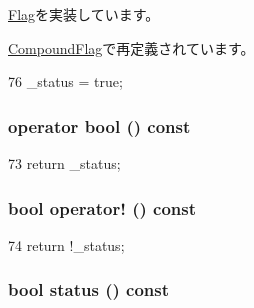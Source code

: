 \hyperlink{classDebug_1_1Flag_ad1c349e10e4417179f5eb3cb519670b5}{Flag}を実装しています。

\hyperlink{classDebug_1_1CompoundFlag_a486f22824bd83c5308a0d70ffac6f758}{CompoundFlag}で再定義されています。


\begin{DoxyCode}
76 { _status = true; }
\end{DoxyCode}
\hypertarget{classDebug_1_1SimpleFlag_aa385aa18f5e42db5a415c25a90f4193d}{
\subsubsection[{operator bool}]{\setlength{\rightskip}{0pt plus 5cm}operator bool () const}}
\label{classDebug_1_1SimpleFlag_aa385aa18f5e42db5a415c25a90f4193d}



\begin{DoxyCode}
73 { return _status; }
\end{DoxyCode}
\hypertarget{classDebug_1_1SimpleFlag_ac8b1d32dbd52d431450c70b151cfa205}{
\subsubsection[{operator!}]{\setlength{\rightskip}{0pt plus 5cm}bool operator! () const}}
\label{classDebug_1_1SimpleFlag_ac8b1d32dbd52d431450c70b151cfa205}



\begin{DoxyCode}
74 { return !_status; }
\end{DoxyCode}
\hypertarget{classDebug_1_1SimpleFlag_a466b2775fe5af9ff94c281d4d1a8fb5a}{
\subsubsection[{status}]{\setlength{\rightskip}{0pt plus 5cm}bool status () const}}
\label{classDebug_1_1SimpleFlag_a466b2775fe5af9ff94c281d4d1a8fb5a}



